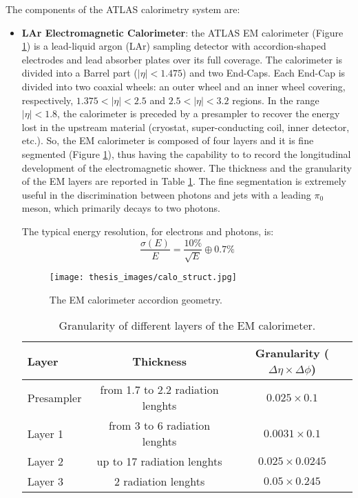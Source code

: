 \documentclass[a4paper, oneside, 11pt, openright]{book}
\begin{document}
				The components of the ATLAS calorimetry system are:
				\begin{itemize}
					\item \textbf{LAr Electromagnetic Calorimeter}: the ATLAS EM calorimeter \cite{LArCalo_report} (Figure \ref{fig:calo struct}) is a lead-liquid argon (LAr) sampling detector with accordion-shaped electrodes and lead absorber plates over its full coverage. The calorimeter is divided into a Barrel part ($|\eta|<1.475$) and two End-Caps. Each End-Cap is divided into two coaxial wheels: an outer wheel and an inner wheel covering, respectively, $1.375<|\eta|<2.5$ and $2.5<|\eta|<3.2$ regions. 
					In the range $|\eta|<1.8$, the calorimeter is preceded by a presampler to recover the energy lost in the upstream material (cryostat, super-conducting coil, inner detector, etc.). So, the EM calorimeter is composed of four layers and it is fine segmented (Figure \ref{fig:calo struct}), thus having the capability to to record the longitudinal development of the electromagnetic shower. The thickness and the granularity of the EM layers are reported in Table \ref{tab:LAr_sample}. The fine segmentation is extremely useful in the discrimination between photons and jets with a leading $\pi_0$ meson, which primarily decays to two photons.
					
					The typical energy resolution, for electrons and photons, is:
					$$ 
					\frac{\sigma(E)}{E} = \frac{10\%}{\sqrt{E}} \oplus 0.7\%
					$$
					
					\begin{figure}
						\centering
						\texttt{[image: thesis\_images/calo\_struct.jpg]}
						\caption{The EM calorimeter accordion geometry.}
						\label{fig:calo struct}
					\end{figure}
					\begin{table}
						\centering
						\begin{tabular}{lcc}
							\toprule[1.5pt]
							\textbf{Layer} & \textbf{Thickness}	& \textbf{Granularity ($\Delta\eta \times \Delta\phi$)} \\
							\midrule
							Presampler 	& from 1.7 to 2.2 radiation lenghts	& $0.025 \times 0.1$ \\
							Layer 1 	& from 3 to 6 radiation lenghts	& $0.0031 \times 0.1$ \\
							Layer 2 	& up to 17 radiation lenghts	& $0.025 \times 0.0245$ \\
							Layer 3 	& 2 radiation lenghts	& $0.05 \times 0.245$ \\
							\bottomrule[1.5pt]
						\end{tabular}
						\caption{Granularity of different layers of the EM calorimeter.}\label{tab:granularity}
						\label{tab:LAr_sample}
					\end{table}


\end{itemize}
\end{document}
